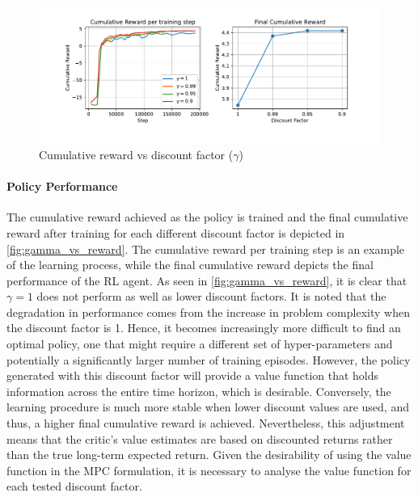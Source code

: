 \begin{figure}[H]
	\centering
	\includegraphics[width = \textwidth]{figures/gamma_reward.pdf}
	\caption{Cumulative reward vs discount factor ($\gamma$)}
	\label{fig:gamma_vs_reward}
\end{figure}

\paragraph{Policy Performance} 
The cumulative reward achieved as the policy is trained and the final cumulative reward after training for each different discount factor is depicted in \autoref{fig:gamma_vs_reward}. The cumulative reward per training step is an example of the learning process, while the final cumulative reward depicts the final performance of the RL agent. As seen in \autoref{fig:gamma_vs_reward}, it is clear that $\gamma = 1$ does not perform as well as lower discount factors. It is noted that the degradation in performance comes from the increase in problem complexity when the discount factor is 1. Hence, it becomes increasingly more difficult to find an optimal policy, one that might require a different set of hyper-parameters and potentially a significantly larger number of training episodes. However, the policy generated with this discount factor will provide a value function that holds information across the entire time horizon, which is desirable. Conversely, the learning procedure is much more stable when lower discount values are used, and thus, a higher final cumulative reward is achieved. Nevertheless, this adjustment means that the critic's value estimates are based on discounted returns rather than the true long-term expected return. Given the desirability of using the value function in the MPC formulation, it is necessary to analyse the value function for each tested discount factor.


